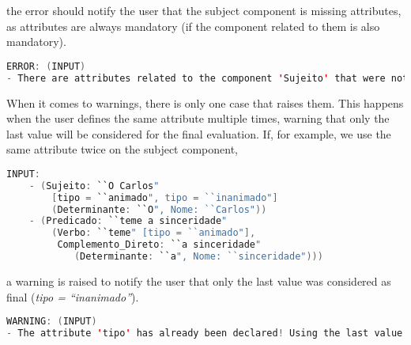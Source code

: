 \noindent the error should notify the user that the subject component is missing attributes, as attributes are always mandatory (if the component related to them is also
mandatory).

\begin{center}
\begin{minipage}{14cm}
\begin{lstlisting}[language=java, basicstyle=\small, label={lst:err_msg_missing_attr}, caption=Example error message of missing attributes]
ERROR: (INPUT)
- There are attributes related to the component 'Sujeito' that were not defined.
\end{lstlisting}
\end{minipage}
\end{center}

When it comes to warnings, there is only one case that raises them. This happens when the user defines the same attribute multiple times, warning that only the last value 
will be considered for the final evaluation. If, for example, we use the same attribute twice on the subject component,

\begin{center}
\begin{minipage}{14cm}
\begin{lstlisting}[language=java, basicstyle=\small, label={lst:meta_input_attr_twice}, caption=Example of the students parsing with the same attribute in a single component]
INPUT:
    - (Sujeito: ``O Carlos" 
        [tipo = ``animado", tipo = ``inanimado"]
        (Determinante: ``O", Nome: ``Carlos"))
    - (Predicado: ``teme a sinceridade" 
        (Verbo: ``teme" [tipo = ``animado"], 
         Complemento_Direto: ``a sinceridade" 
            (Determinante: ``a", Nome: ``sinceridade")))
\end{lstlisting}
\end{minipage}
\end{center}

\noindent a warning is raised to notify the user that only the last value was considered as final (\emph{tipo = ``inanimado''}).

\begin{center}
\begin{minipage}{14cm}
\begin{lstlisting}[language=java, basicstyle=\small, label={lst:meta_input_missing_attr_warn}, caption=Example warning message of same attribute in a single component]
WARNING: (INPUT) 
- The attribute 'tipo' has already been declared! Using the last value found.
\end{lstlisting}
\end{minipage}
\end{center}

